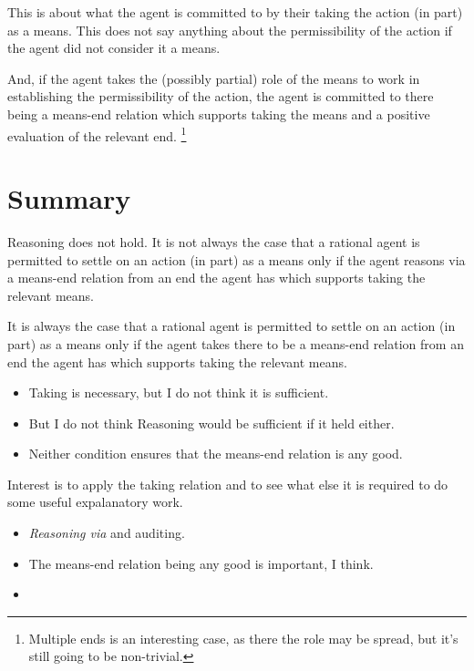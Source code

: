 \documentclass[10pt]{article}
\newcommand{\schemaName}[1]{\textsf{#1}}
\begin{document}
This is about what the agent is committed to by their taking the action (in part) as a means.
This does not say anything about the permissibility of the action if the agent did not consider it a means.

And, if the agent takes the (possibly partial) role of the means to work in establishing the permissibility of the action, the agent is committed to there being a means-end relation which supports taking the means and a positive evaluation of the relevant end.\nolinebreak
\footnote{Multiple ends is an interesting case, as there the role may be spread, but it's still going to be non-trivial.}

\newpage


\section{Summary}
\label{sec:summary}


\schemaName{Reasoning} does not hold.
It is not always the case that a rational agent is permitted to settle on an action (in part) as a means only if the agent reasons via a means-end relation from an end the agent has which supports taking the relevant means.

It is always the case that a rational agent is permitted to settle on an action (in part) as a means only if the agent takes there to be a means-end relation from an end the agent has which supports taking the relevant means.

\begin{itemize}
\item \schemaName{Taking} is necessary, but I do not think it is sufficient.
\item But I do not think \schemaName{Reasoning} would be sufficient if it held either.
\item Neither condition ensures that the means-end relation is any good.
\end{itemize}

Interest is to apply the taking relation and to see what else it is required to do some useful expalanatory work.

\begin{itemize}
\item \emph{Reasoning via} and auditing.
\item The means-end relation being any good is important, I think.
\item 
\end{itemize}
\end{document}
